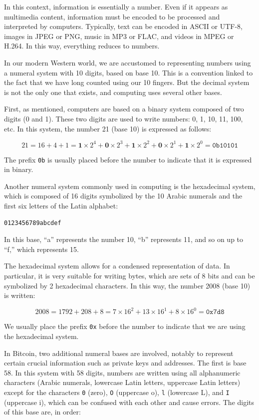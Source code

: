 \documentclass[
  a5paper,
  smalldemyvopaper,10pt,twoside,onecolumn,openright,extrafontsizes,hidelinks]{memoir}
\begin{document}
In this context, information is essentially a number. Even if it appears
as multimedia content, information must be encoded to be processed and
interpreted by computers. Typically, text can be encoded in ASCII or
UTF-8, images in JPEG or PNG, music in MP3 or FLAC, and videos in MPEG
or H.264. In this way, everything reduces to numbers.

In our modern Western world, we are accustomed to representing numbers
using a numeral system with 10 digits, based on base 10. This is a
convention linked to the fact that we have long counted using our 10
fingers. But the decimal system is not the only one that exists, and
computing uses several other bases.

First, as mentioned, computers are based on a binary system composed of
two digits (0 and 1). These two digits are used to write numbers: 0, 1,
10, 11, 100, etc. In this system, the number 21 (base 10) is expressed
as follows:

\[21 = 16 + 4 + 1 = \mathbf{1} \times 2^4 + \mathbf{0} \times 2^3 + \mathbf{1} \times 2^2 + \mathbf{0} \times 2^1 + \mathbf{1} \times 2^0 = \mathtt{0b10101}\]

The prefix \texttt{0b} is usually placed before the number to indicate
that it is expressed in binary.

Another numeral system commonly used in computing is the hexadecimal
system, which is composed of 16 digits symbolized by the 10 Arabic
numerals and the first six letters of the Latin alphabet:

\begin{verbatim}
0123456789abcdef
\end{verbatim}

In this base, ``a'' represents the number 10, ``b'' represents 11, and
so on up to ``f,'' which represents 15.

The hexadecimal system allows for a condensed representation of data. In
particular, it is very suitable for writing bytes, which are sets of 8
bits and can be symbolized by 2 hexadecimal characters. In this way, the
number 2008 (base 10) is written:

\[2008 = 1792 + 208 + 8 = 7 \times 16^2 + 13 \times 16^1 + 8 \times 16^0 = \mathtt{0x7d8}\]

We usually place the prefix \texttt{0x} before the number to indicate
that we are using the hexadecimal system.

In Bitcoin, two additional numeral bases are involved, notably to
represent certain crucial information such as private keys and
addresses. The first is base 58. In this system with 58 digits, numbers
are written using all alphanumeric characters (Arabic numerals,
lowercase Latin letters, uppercase Latin letters) except for the
characters \texttt{0} (zero), \texttt{O} (uppercase o), \texttt{l}
(lowercase L), and \texttt{I} (uppercase i), which can be confused with
each other and cause errors. The digits of this base are, in order:
\end{document}
